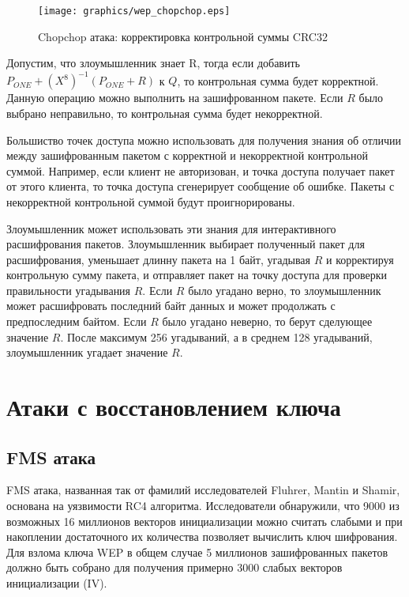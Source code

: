 \begin{figure}
    \texttt{[image: graphics/wep\_chopchop.eps]}
    \caption{Chopchop атака: корректировка контрольной суммы CRC32}
    \label{fig:wep_chopchop}
\end{figure}

Допустим, что злоумышленник знает R, тогда если добавить $P_{ONE} +
(X^8)^{-1}(P_{ONE} + R)$ к $Q$, то контрольная сумма будет корректной. Данную
операцию можно выполнить на зашифрованном пакете. Если $R$ было выбрано
неправильно, то контрольная сумма будет некорректной.

Большиство точек доступа можно использовать для получения знания об отличии
между зашифрованным пакетом с корректной и некорректной контрольной суммой.
Например, если клиент не авторизован, и точка доступа получает пакет от этого
клиента, то точка доступа сгенерирует сообщение об ошибке. Пакеты с некорректной
контрольной суммой будут проигнорированы.

Злоумышленник может использовать эти знания для интерактивного расшифрования
пакетов. Злоумышленник выбирает полученный пакет для расшифрования, уменьшает
длинну пакета на 1 байт, угадывая $R$ и корректируя контрольную сумму пакета, и
отправляет пакет на точку доступа для проверки правильности угадывания $R$. Если
$R$ было угадано верно, то злоумышленник может расшифровать последний байт
данных и может продолжать с предпоследним байтом. Если $R$ было угадано неверно,
то берут сделующее значение $R$. После максимум 256 угадываний, а в среднем 128
угадываний, злоумышленник угадает значение $R$.


\section{Атаки с восстановлением ключа}

\subsection{FMS атака}

FMS атака, названная так от фамилий исследователей Fluhrer, Mantin и Shamir,
основана на уязвимости RC4 алгоритма. Исследователи обнаружили, что 9000 из
возможных 16 миллионов векторов инициализации можно считать слабыми и при
накоплении достаточного их количества позволяет вычислить ключ шифрования. Для
взлома ключа WEP в общем случае 5 миллионов зашифрованных пакетов должно быть
собрано для получения примерно 3000 слабых векторов инициализации (IV).

